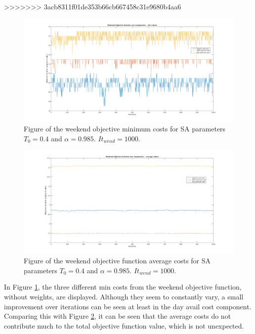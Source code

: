 >>>>>>> 3acb8311f01de353b66cb667458c31e9680b4aa6

\begin{figure}[!h]
\centering
\includegraphics[width=\textwidth, trim = 100px 50px 100px 20px, clip]{Chapters/ImagesEmelie/Components_1000_20.png}
\caption{Figure of the weekend objective minimum costs for SA parameters $T_0 = 0.4$ and $\alpha = 0.985$. $It_{wend} = 1000$.}
\label{fig:obj_fun_comp}
\end{figure}

\begin{figure}[!h]
\centering
\includegraphics[width=\textwidth, trim = 100px 50px 100px 20px, clip]{Chapters/ImagesEmelie/Components_av_1000_20.png}
\caption{Figure of the weekend objective function average costs for SA parameters $T_0 = 0.4$ and $\alpha = 0.985$. $It_{wend} = 1000$.}
\label{fig:obj_fun_comp_aver}
\end{figure}


In Figure \ref{fig:obj_fun_comp}, the three different min costs from the weekend objective function, without weights, are displayed. Although they seem to constantly vary, a small improvement over iterations can be seen at least in the day avail cost component. Comparing this with Figure \ref{fig:obj_fun_comp_aver}, it can be seen that the average costs do not contribute much to the total objective function value, which is not unexpected.

